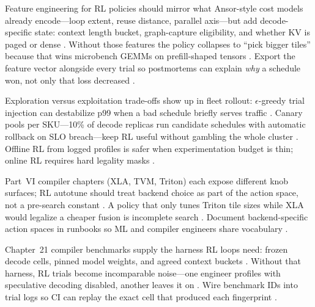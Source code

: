 Feature engineering for RL policies should mirror what Ansor-style cost models already encode---loop extent, reuse distance, parallel axis---but add decode-specific state: context length bucket, graph-capture eligibility, and whether KV is paged or dense \citep{chen2020compilerbasedhardw,kwon2023vllm,nvidia2024cudagraphs}. Without those features the policy collapses to ``pick bigger tiles'' because that wins microbench GEMMs on prefill-shaped tensors \citep{taxbreak2026,memoryfloor2026,patel2025llminference}. Export the feature vector alongside every trial so postmortems can explain \emph{why} a schedule won, not only that loss decreased \citep{yirage2026,chen2020compilerbasedhardw,dlbook}.

Exploration versus exploitation trade-offs show up in fleet rollout: $\epsilon$-greedy trial injection can destabilize p99 when a bad schedule briefly serves traffic \citep{patel2025llminference,kwon2023vllm}. Canary pools per SKU---10\% of decode replicas run candidate schedules with automatic rollback on SLO breach---keep RL useful without gambling the whole cluster \citep{liu2024deepseekv3,yirage2026,memoryfloor2026}. Offline RL from logged profiles is safer when experimentation budget is thin; online RL requires hard legality masks \citep{chen2020compilerbasedhardw,amd2024aie,dlbook}.

Part~VI compiler chapters (XLA, TVM, Triton) each expose different knob surfaces; RL autotune should treat backend choice as part of the action space, not a pre-search constant \citep{chen2020compilerbasedhardw,yirage2026,semianalysis2024tma}. A policy that only tunes Triton tile sizes while XLA would legalize a cheaper fusion is incomplete search \citep{taxbreak2026,memoryfloor2026,patel2025llminference,dao2022flashattention,kwon2023vllm,liu2024deepseekv3,amd2024xdna,amd2024aie,dlbook,nvidia2022hopper,nvidia2024cudagraphs,dao2023flashdecoding}. Document backend-specific action spaces in runbooks so ML and compiler engineers share vocabulary \citep{yirage2026,chen2020compilerbasedhardw}.

Chapter~21 compiler benchmarks supply the harness RL loops need: frozen decode cells, pinned model weights, and agreed context buckets \citep{chen2020compilerbasedhardw,patel2025llminference,taxbreak2026,memoryfloor2026}. Without that harness, RL trials become incomparable noise---one engineer profiles with speculative decoding disabled, another leaves it on \citep{kwon2023vllm,liu2024deepseekv3,yirage2026}. Wire benchmark IDs into trial logs so CI can replay the exact cell that produced each fingerprint \citep{yirage2026,chen2020compilerbasedhardw,memoryfloor2026,taxbreak2026,patel2025llminference,dlbook,amd2024aie,semianalysis2024tma,amd2024xdna,dao2022flashattention,dao2023flashdecoding,nvidia2024cudagraphs,nvidia2022hopper,kwon2023vllm,liu2024deepseekv3}.

